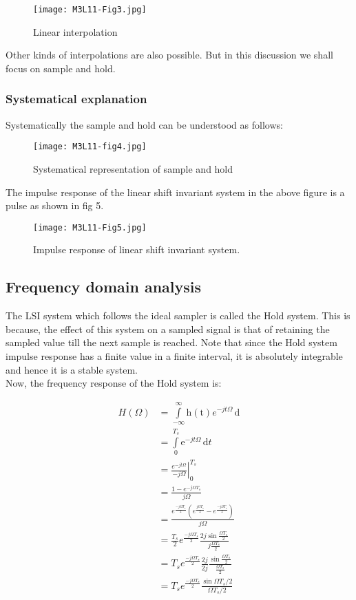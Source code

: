 \begin{figure}[ht]
\centering
\texttt{[image: M3L11-Fig3.jpg]}
\caption{Linear interpolation}
\end{figure}


Other kinds of interpolations are also possible. But in this discussion we shall focus on sample and hold.

\subsubsection{Systematical explanation}

Systematically the sample and hold can be understood as follows:

\begin{figure}[ht]
\centering
\texttt{[image: M3L11-fig4.jpg]}
\caption{Systematical representation of sample and hold}
\end{figure}

The impulse response of the linear shift invariant system in the above figure is a pulse as shown in fig 5.

\begin{figure}[ht]
\centering
\texttt{[image: M3L11-Fig5.jpg]}
\caption{Impulse response of linear shift invariant system.
}\end{figure}

\subsection{Frequency domain analysis}
The LSI system which follows the ideal sampler is called the Hold system. This is because, the effect of this system on a sampled signal is that of retaining the sampled value till the next sample is reached. Note that since the Hold system impulse response has a finite value in a finite interval, it is absolutely integrable and hence it is a stable system.
\\
Now, the frequency response of the Hold system is:

\begin{align*}
H(\Omega) &=\int\limits_{-\infty}^{\infty}\mathrm{h(t)}{e}^{-jt\Omega}\,\mathrm{d}\\
&=\int\limits_{0}^{T_{s}}\mathrm{e}^{-jt\Omega}\,\mathrm{d}t\\
&=\left.\frac{e^{-jt\Omega}}{-j\Omega}\right|_0^{T_{s}}\\
&=\frac{1-e ^{-j\Omega T_s}}{j \Omega}\\
&=\frac{e^\frac{-j \Omega T_s}{2} \left(e^{\frac{j \Omega T_s}{2}} - e^{\frac{-j \Omega T_s}{2}}\right)}{j \Omega}\\
&=\frac{T_s}{2} e^{\frac{-j \Omega T_s}{2}} \frac{2j \sin{\frac{\Omega T_s}{2}}}{j \frac{\Omega T_s}{2}}\\
&=T_s e^\frac{-j \Omega T_s}{2}\frac{2j}{2j} \frac{\sin{\frac{\Omega T_s}{2}}}{\frac{\Omega T_s}{2}}\\
&=T_s e^{\frac{-j \Omega T_s}{2}} \frac{\sin{\Omega T_s/2}}{\Omega T_s/2}
\end{align*}

